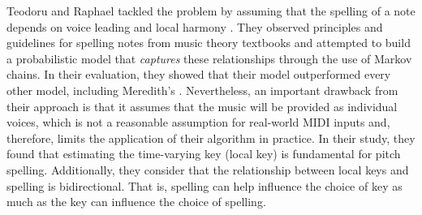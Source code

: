 Teodoru and Raphael tackled the problem by assuming that the
spelling of a note depends on voice leading and local
harmony \parencite{teodoru2007pitch}. They observed
principles and guidelines for spelling notes from music
theory textbooks \parencite{aldwell2017harmony,
rimskykorsakov2005practical} and attempted to build a
probabilistic model that \emph{captures} these relationships
through the use of Markov chains. In their evaluation, they
showed that their model outperformed every other model,
including Meredith's \parencite{meredith_ps13_2006}.
Nevertheless, an important drawback from their approach is
that it assumes that the music will be provided as
individual voices, which is not a reasonable assumption for
real-world MIDI inputs and, therefore, limits the
application of their algorithm in practice. In their study,
they found that estimating the time-varying key (local key)
is fundamental for pitch spelling. Additionally, they
consider that the relationship between local keys and
spelling is bidirectional. That is, spelling can help
influence the choice of key as much as the key can influence
the choice of spelling.
